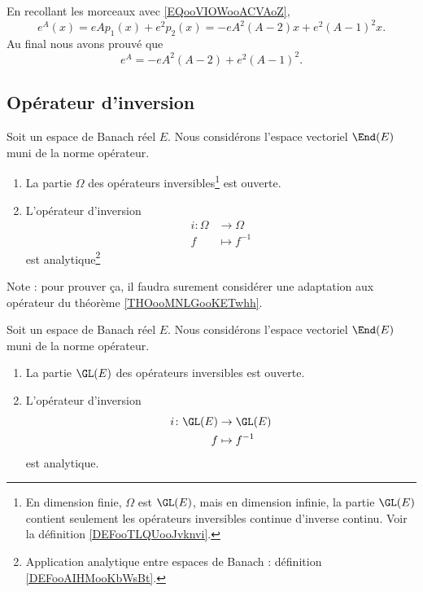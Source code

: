 En recollant les morceaux avec \eqref{EQooVIOWooACVAoZ},
\begin{equation}
	e^{A}(x)=eAp_1(x)+e^2p_2(x)=-eA^2(A-2)x+e^2(A-1)^2x.
\end{equation}
Au final nous avons prouvé que
\begin{equation}
	e^{A}=-eA^2(A-2)+e^2(A-1)^2.
\end{equation}


\subsection{Opérateur d'inversion}

\begin{proposition}	\label{PROPooSGVWooQupJxn}
	Soit un espace de Banach réel \( E\). Nous considérons l'espace vectoriel \( \End(E)\) muni de la norme opérateur.
	\begin{enumerate}
		\item
		      La partie \( \Omega\) des opérateurs inversibles\footnote{En dimension finie, \( \Omega\) est \( \GL(E)\), mais en dimension infinie, la partie \( \GL(E)\) contient seulement les opérateurs inversibles continue d'inverse continu. Voir la définition \ref{DEFooTLQUooJvknvi}.} est ouverte.
		\item
		      L'opérateur d'inversion
		      \begin{equation}
			      \begin{aligned}
				      i\colon \Omega & \to \Omega     \\
				      f              & \mapsto f^{-1}
			      \end{aligned}
		      \end{equation}
		      est analytique\footnote{Application analytique entre espaces de Banach : définition \ref{DEFooAIHMooKbWsBt}.}
	\end{enumerate}
\end{proposition}
Note : pour prouver ça, il faudra surement considérer une adaptation aux opérateur du théorème \ref{THOooMNLGooKETwhh}.


\begin{proposition}	\label{PROPooFXPZooKUEarD}
	Soit un espace de Banach réel \( E\). Nous considérons l'espace vectoriel \( \End(E)\) muni de la norme opérateur.
	\begin{enumerate}
		\item
		      La partie \( \GL(E)\) des opérateurs inversibles est ouverte.
		\item
		      L'opérateur d'inversion
		      \begin{equation}
			      \begin{aligned}
				      i\colon \GL(E) & \to \GL(E)     \\
				      f              & \mapsto f^{-1}
			      \end{aligned}
		      \end{equation}
		      est analytique.
	\end{enumerate}
\end{proposition}


